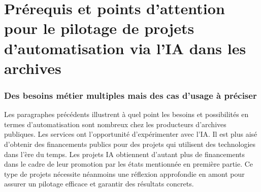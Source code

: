 \chapter{Prérequis et points d’attention pour le pilotage de projets d’automatisation via l’IA dans les archives}

\subsection{Des besoins métier multiples mais des cas d'usage à préciser}

Les paragraphes précédents illustrent à quel point les besoins et possibilités en termes
d'automatisation sont nombreux chez les producteurs d'archives publiques.
Les services ont l'opportunité d'expérimenter avec l'IA. Il est plus aisé
d'obtenir des financements publics pour des projets qui utilisent des
technologies dans l'ère du temps. Les projets IA obtiennent d'autant
plus de financements dans le cadre de leur promotion par les états
mentionnée en première partie. Ce type de projets nécessite néanmoins une
réflexion approfondie en amont pour assurer un pilotage efficace et
garantir des résultats concrets.\newline


